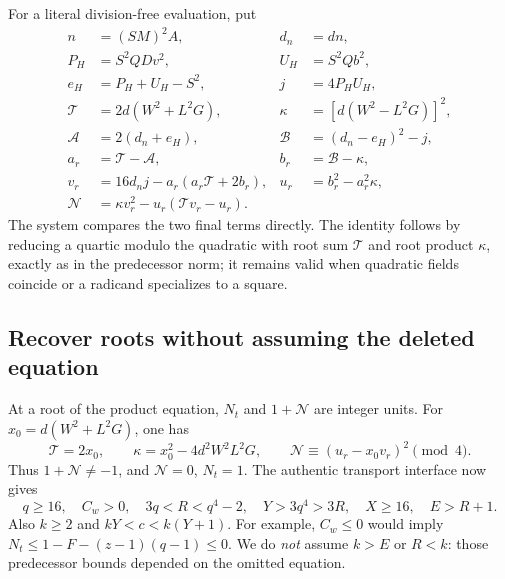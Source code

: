For a literal division-free evaluation, put
\begin{align*}
 n&=(SM)^2A,&d_n&=dn,\\
 P_H&=S^2QDv^2,&U_H&=S^2Qb^2,\\
 e_H&=P_H+U_H-S^2,&j&=4P_HU_H,\\
 \mathcal T&=2d(W^2+L^2G),&\kappa&=[d(W^2-L^2G)]^2,\\
 \mathcal A&=2(d_n+e_H),&\mathcal B&=(d_n-e_H)^2-j,\\
 a_r&=\mathcal T-\mathcal A,&b_r&=\mathcal B-\kappa,\\
 v_r&=16d_nj-a_r(a_r\mathcal T+2b_r),&u_r&=b_r^2-a_r^2\kappa,\\
 \mathcal N&=\kappa v_r^2-u_r(\mathcal T v_r-u_r).
\end{align*}
The system compares the two final terms directly. The identity follows by
reducing a quartic modulo the quadratic with root sum $\mathcal T$ and root
product $\kappa$, exactly as in the predecessor norm; it remains valid when
quadratic fields coincide or a radicand specializes to a square.

\subsection{Recover roots without assuming the deleted equation}

At a root of the product equation, $N_t$ and $1+\mathcal N$ are integer
units. For $x_0=d(W^2+L^2G)$, one has
\[
 \mathcal T=2x_0,\qquad
 \kappa=x_0^2-4d^2W^2L^2G,\qquad
 \mathcal N\equiv(u_r-x_0v_r)^2\pmod4.
\]
Thus $1+\mathcal N\ne-1$, and $\mathcal N=0$, $N_t=1$. The authentic
transport interface now gives
\begin{equation}
 q\ge16,\quad C_w>0,\quad 3q<R<q^4-2,\quad
 Y>3q^4>3R,\quad X\ge16,\quad E>R+1.
 \label{eq:eleven-outer}
\end{equation}
Also $k\ge2$ and $kY<c<k(Y+1)$. For example, $C_w\le0$ would imply
$N_t\le1-F-(z-1)(q-1)\le0$. We do \emph{not} assume $k>E$ or $R<k$:
those predecessor bounds depended on the omitted equation.


